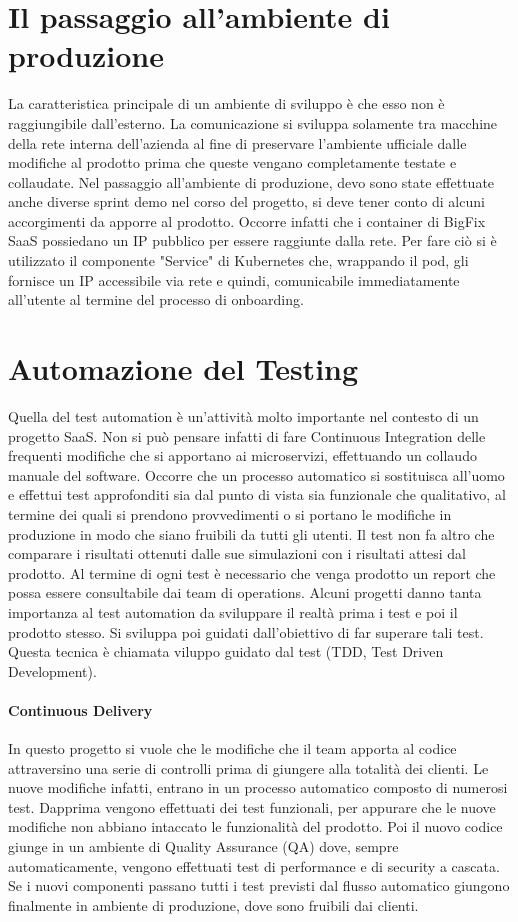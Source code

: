 \section{Il passaggio all'ambiente di produzione}
La caratteristica principale di un ambiente di sviluppo è che esso non è raggiungibile dall'esterno. La comunicazione si sviluppa solamente tra macchine della rete interna dell'azienda al fine di preservare l'ambiente ufficiale dalle modifiche al prodotto prima che queste vengano completamente testate e collaudate. Nel passaggio all'ambiente di produzione, devo sono state effettuate anche diverse sprint demo nel corso del progetto, si deve tener conto di alcuni accorgimenti da apporre al prodotto. Occorre infatti che i container di BigFix SaaS possiedano un IP pubblico per essere raggiunte dalla rete. Per fare ciò si è utilizzato il componente "Service" di Kubernetes che, wrappando il pod, gli fornisce un IP accessibile via rete e quindi, comunicabile immediatamente all'utente al termine del processo di onboarding.

\section{Automazione del Testing}
Quella del test automation è un'attività molto importante nel contesto di un progetto SaaS. Non si può pensare infatti di fare Continuous Integration delle frequenti modifiche che si apportano ai microservizi, effettuando un collaudo manuale del software. Occorre che un processo automatico si sostituisca all'uomo e effettui test approfonditi sia dal punto di vista sia funzionale che qualitativo, al termine dei quali si prendono provvedimenti o si portano le modifiche in produzione in modo che siano fruibili da tutti gli utenti. Il test non fa altro che comparare i risultati ottenuti dalle sue simulazioni con i risultati attesi dal prodotto. Al termine di ogni test è necessario che venga prodotto un report che possa essere consultabile dai team di operations. Alcuni progetti danno tanta importanza al test automation da sviluppare il realtà prima i test e poi il prodotto stesso. Si sviluppa poi guidati dall'obiettivo di far superare tali test. Questa tecnica è chiamata viluppo guidato dal test (TDD, Test Driven Development).
\paragraph{Continuous Delivery}
In questo progetto si vuole che le modifiche che il team apporta al codice attraversino una serie di controlli prima di giungere alla totalità dei clienti. Le nuove modifiche infatti, entrano in un processo automatico composto di numerosi test. Dapprima vengono effettuati dei test funzionali, per appurare che le nuove modifiche non abbiano intaccato le funzionalità del prodotto. Poi il nuovo codice giunge in un ambiente di Quality Assurance (QA) dove, sempre automaticamente, vengono effettuati test di performance e di security a cascata. Se i nuovi componenti passano tutti i test previsti dal flusso automatico giungono finalmente in ambiente di produzione, dove sono fruibili dai clienti. 
